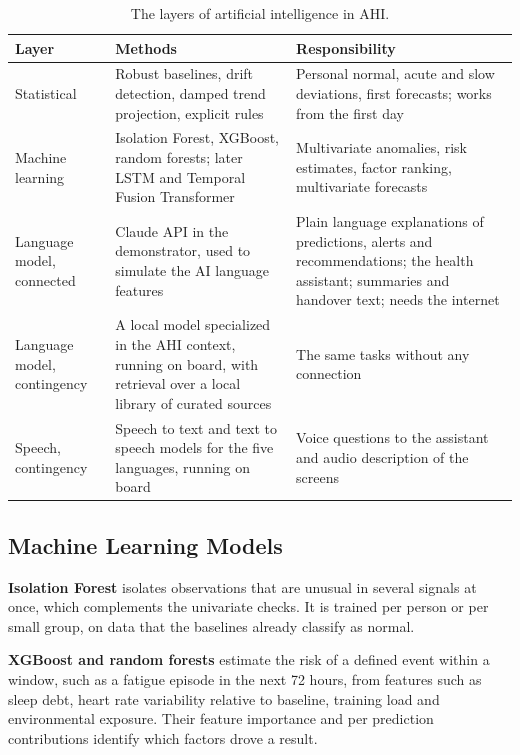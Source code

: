 \begin{table}[htbp]
\centering
\vspace{0.8em}
\caption{The layers of artificial intelligence in AHI.}
\label{tab:ai-layers}
\small
\begin{tabular}{p{3.4cm}p{5.0cm}p{5.6cm}}
\hline
\textbf{Layer} & \textbf{Methods} & \textbf{Responsibility} \\
\hline
Statistical & Robust baselines, drift detection, damped trend projection, explicit rules & Personal normal, acute and slow deviations, first forecasts; works from the first day \\
Machine learning & Isolation Forest, XGBoost, random forests; later LSTM and Temporal Fusion Transformer & Multivariate anomalies, risk estimates, factor ranking, multivariate forecasts \\
Language model, connected & Claude API in the demonstrator, used to simulate the AI language features & Plain language explanations of predictions, alerts and recommendations; the health assistant; summaries and handover text; needs the internet \\
Language model, contingency & A local model specialized in the AHI context, running on board, with retrieval over a local library of curated sources & The same tasks without any connection \\
Speech, contingency & Speech to text and text to speech models for the five languages, running on board & Voice questions to the assistant and audio description of the screens \\
\hline
\end{tabular}
\vspace{1.2em}
\end{table}

\subsection{Machine Learning Models}
\label{subsec:ml-models}

\medskip\noindent\textbf{Isolation Forest} isolates observations that are unusual in several signals at once, which complements the univariate checks. It is trained per person or per small group, on data that the baselines already classify as normal.

\medskip\noindent\textbf{XGBoost and random forests} estimate the risk of a defined event within a window, such as a fatigue episode in the next 72 hours, from features such as sleep debt, heart rate variability relative to baseline, training load and environmental exposure. Their feature importance and per prediction contributions identify which factors drove a result.

